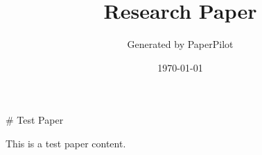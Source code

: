 \documentclass{article}
\title{Research Paper}
\author{Generated by PaperPilot}
\date{\today}
\begin{document}
        
        \maketitle
        
        # Test Paper

This is a test paper content.
        
        
\end{document}

